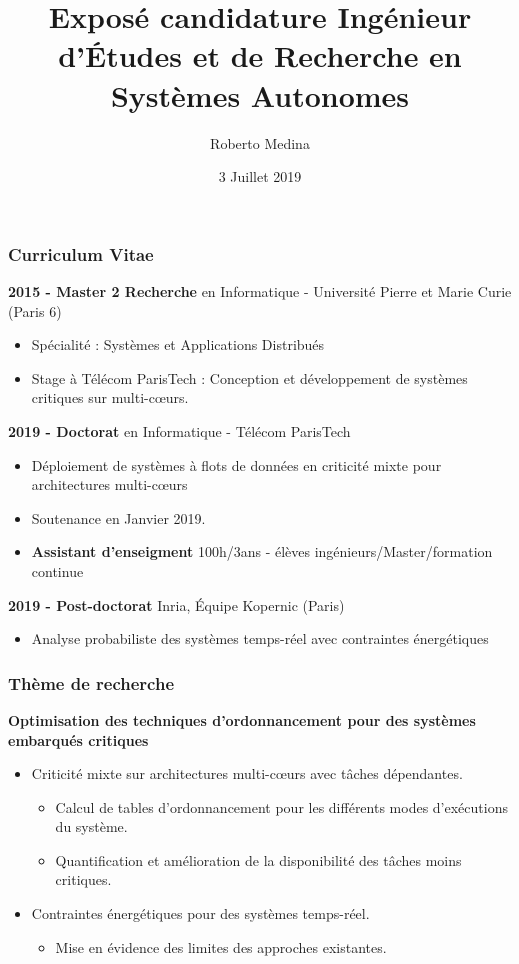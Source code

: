 \documentclass{beamer}
\title[]{Exposé candidature 
Ingénieur d'Études et de Recherche en Systèmes Autonomes} %
\author{Roberto Medina} %
\institute[Inria] %
{
Post-doctorant dans l'équipe Kopernic, Inria\\
Docteur en informatique de Télécom ParisTech\\
\medskip
\textit{roberto.medina-bonilla@inria.fr} %
}
\date{3 Juillet 2019} %
\begin{document}
\begin{frame}
\titlepage %
\end{frame}


\begin{frame}
	\frametitle{Curriculum Vitae}
	\textbf{2015 - Master 2 Recherche} en Informatique - 
			Université Pierre et Marie Curie (Paris 6)
		\begin{itemize}
			\item Spécialité : Systèmes et Applications Distribués
			\item Stage à Télécom ParisTech : Conception et développement de 
			systèmes critiques sur multi-c\oe{}urs.
		\end{itemize}
	
	\textbf{2019 - Doctorat} en Informatique - Télécom ParisTech
		\begin{itemize}
			\item Déploiement de systèmes à flots de données en criticité mixte 
			pour architectures multi-c\oe{}urs
			\item Soutenance en Janvier 2019.
			\item \textbf{Assistant d'enseigment} 100h/3ans - élèves 
			ingénieurs/Master/formation continue
		\end{itemize}
	\textbf{2019 - Post-doctorat} Inria, Équipe Kopernic (Paris)
		\begin{itemize}
			\item Analyse probabiliste des systèmes temps-réel avec contraintes 
			énergétiques
		\end{itemize}
\end{frame}


\begin{frame}
	\frametitle{Thème de recherche}
	\centering
	\textbf{Optimisation des techniques d'ordonnancement pour des systèmes 
	embarqués critiques}
	\begin{itemize}
		\item Criticité mixte sur architectures multi-c\oe{}urs 
		avec tâches dépendantes.
		\begin{itemize}
			\item Calcul de tables d'ordonnancement pour les différents modes 
			d'exécutions du système.
			\item Quantification et amélioration de la disponibilité des tâches 
			moins critiques.
		\end{itemize}
		\item Contraintes énergétiques pour des systèmes temps-réel.
		\begin{itemize}
			\item Mise en évidence des limites des approches existantes.
		\end{itemize}
	\end{itemize}
\end{frame}
\end{document}
